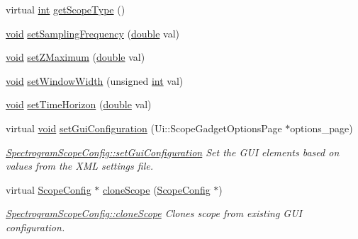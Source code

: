 \begin{DoxyCompactItemize}
\item 
virtual \hyperlink{ioapi_8h_a787fa3cf048117ba7123753c1e74fcd6}{int} \hyperlink{group___scope_plugin_gab53e8753102217ba194ab539f0892bd7}{get\-Scope\-Type} ()
\item 
\hyperlink{group___u_a_v_objects_plugin_ga444cf2ff3f0ecbe028adce838d373f5c}{void} \hyperlink{group___scope_plugin_ga3e3207be4ff4a10b7ec3df051d76c3f6}{set\-Sampling\-Frequency} (\hyperlink{_super_l_u_support_8h_a8956b2b9f49bf918deed98379d159ca7}{double} val)
\item 
\hyperlink{group___u_a_v_objects_plugin_ga444cf2ff3f0ecbe028adce838d373f5c}{void} \hyperlink{group___scope_plugin_ga4f71e9c45cd8cbebb11505f9f6d18a42}{set\-Z\-Maximum} (\hyperlink{_super_l_u_support_8h_a8956b2b9f49bf918deed98379d159ca7}{double} val)
\item 
\hyperlink{group___u_a_v_objects_plugin_ga444cf2ff3f0ecbe028adce838d373f5c}{void} \hyperlink{group___scope_plugin_gaf3bc69a747cec5908674e2df1118cd82}{set\-Window\-Width} (unsigned \hyperlink{ioapi_8h_a787fa3cf048117ba7123753c1e74fcd6}{int} val)
\item 
\hyperlink{group___u_a_v_objects_plugin_ga444cf2ff3f0ecbe028adce838d373f5c}{void} \hyperlink{group___scope_plugin_ga511f9914f1f524bd49a6edfa18760501}{set\-Time\-Horizon} (\hyperlink{_super_l_u_support_8h_a8956b2b9f49bf918deed98379d159ca7}{double} val)
\item 
virtual \hyperlink{group___u_a_v_objects_plugin_ga444cf2ff3f0ecbe028adce838d373f5c}{void} \hyperlink{group___scope_plugin_gaf4d1958704699a8b7bb596fef64c6bd5}{set\-Gui\-Configuration} (Ui\-::\-Scope\-Gadget\-Options\-Page $\ast$options\-\_\-page)
\begin{DoxyCompactList}\small\item\em \hyperlink{group___scope_plugin_gaf4d1958704699a8b7bb596fef64c6bd5}{Spectrogram\-Scope\-Config\-::set\-Gui\-Configuration} Set the G\-U\-I elements based on values from the X\-M\-L settings file. \end{DoxyCompactList}\item 
virtual \hyperlink{class_scope_config}{Scope\-Config} $\ast$ \hyperlink{group___scope_plugin_ga7d2fafe0c5f703d03825ad42689a9d73}{clone\-Scope} (\hyperlink{class_scope_config}{Scope\-Config} $\ast$)
\begin{DoxyCompactList}\small\item\em \hyperlink{group___scope_plugin_ga7d2fafe0c5f703d03825ad42689a9d73}{Spectrogram\-Scope\-Config\-::clone\-Scope} Clones scope from existing G\-U\-I configuration. \end{DoxyCompactList}\item 

\end{DoxyCompactItemize}
